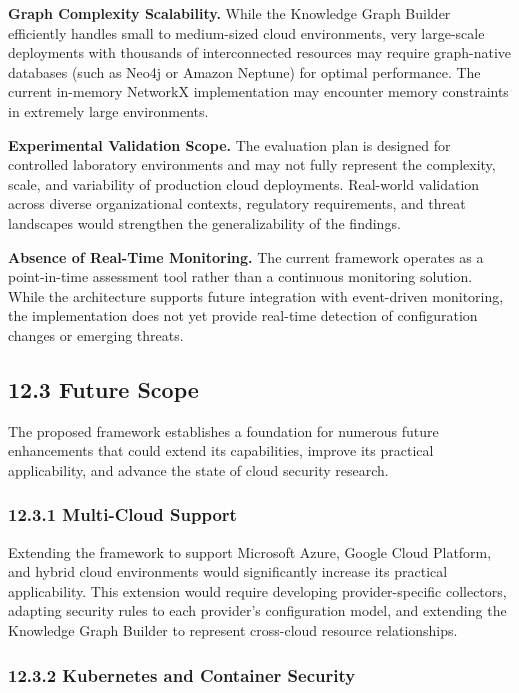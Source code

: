 \textbf{Graph Complexity Scalability.} While the Knowledge Graph Builder efficiently handles small to medium-sized cloud environments, very large-scale deployments with thousands of interconnected resources may require graph-native databases (such as Neo4j or Amazon Neptune) for optimal performance. The current in-memory NetworkX implementation may encounter memory constraints in extremely large environments.

\textbf{Experimental Validation Scope.} The evaluation plan is designed for controlled laboratory environments and may not fully represent the complexity, scale, and variability of production cloud deployments. Real-world validation across diverse organizational contexts, regulatory requirements, and threat landscapes would strengthen the generalizability of the findings.

\textbf{Absence of Real-Time Monitoring.} The current framework operates as a point-in-time assessment tool rather than a continuous monitoring solution. While the architecture supports future integration with event-driven monitoring, the implementation does not yet provide real-time detection of configuration changes or emerging threats.

\subsection{12.3 Future Scope}

The proposed framework establishes a foundation for numerous future enhancements that could extend its capabilities, improve its practical applicability, and advance the state of cloud security research.

\subsubsection{12.3.1 Multi-Cloud Support}

Extending the framework to support Microsoft Azure, Google Cloud Platform, and hybrid cloud environments would significantly increase its practical applicability. This extension would require developing provider-specific collectors, adapting security rules to each provider's configuration model, and extending the Knowledge Graph Builder to represent cross-cloud resource relationships.

\subsubsection{12.3.2 Kubernetes and Container Security}

